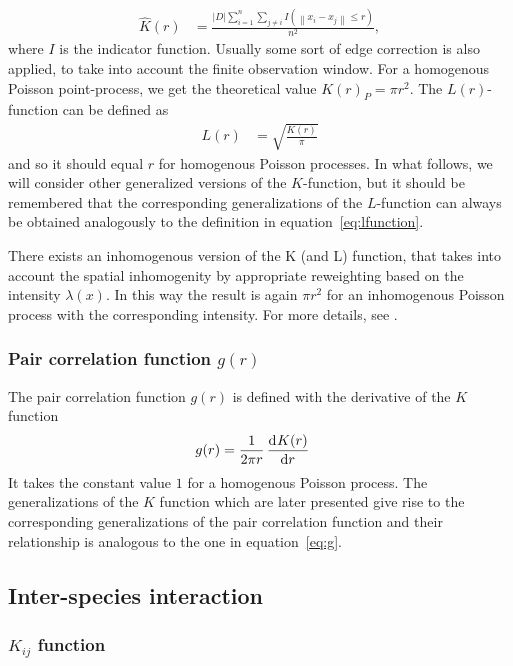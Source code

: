 \documentclass[12pt,a4paper,oneside,article]{memoir}
\begin{document}
\begin{align}
	\hat{K}(r)&=\frac{\left|D\right|\sum_{i=1}^n\sum_{j\neq i}I\left(\left\| x_i-x_j\right\|\leq r\right)}{n^2},
	\label{eq:Kest}
\end{align} 
where $I$ is the indicator function. Usually some sort of edge correction is also applied, to take into
account the finite observation window. For a homogenous Poisson point-process, we get
the theoretical value $K(r)_{P}=\pi r^2$.
The $L(r)$-function can be defined as
\begin{align}
	L(r)&=\sqrt{\frac{K(r)}{\pi}}
	\label{eq:lfunction}
\end{align}
and so it should equal $r$ for homogenous Poisson processes. In what follows, we will
consider other generalized versions of the $K$-function, but it should be remembered
that the corresponding generalizations of the $L$-function can always be obtained
analogously to the definition in equation~\eqref{eq:lfunction}.

There exists an inhomogenous version of the K (and L) function, that takes into account
the spatial inhomogenity by appropriate reweighting based on the intensity $\lambda(x)$. In this way the result is
again $\pi r^2$ for an inhomogenous Poisson process with the corresponding intensity. For more details,
see \cite{inhomogenousK}.

\subsubsection{Pair correlation function $g(r)$}

The pair correlation function $g(r)$ is defined with the derivative of the $K$ function
\begin{align}
	g(r)&=\frac{1}{2\pi r}\dod{K(r)}{r}
	\label{eq:g}
\end{align}
It takes the constant value $1$ for a homogenous Poisson process. The
generalizations of the $K$ function which are later presented give rise
to the corresponding generalizations of the pair correlation function and
their relationship is analogous to the one in equation~\eqref{eq:g}.


\subsection{Inter-species interaction}

\subsubsection{$K_{ij}$ function}
\end{document}
